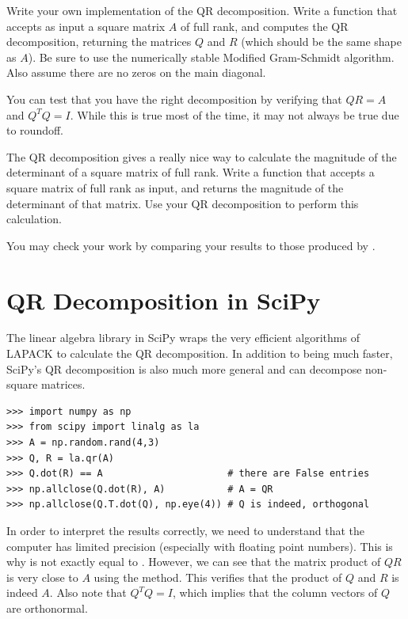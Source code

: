 \begin{problem}
\label{prob:QR}
Write your own implementation of the QR decomposition. Write a function  that accepts as input a square matrix $A$ of full rank, and computes the QR decomposition, returning the matrices $Q$ and $R$ (which should be the same shape as $A$). Be sure to use the numerically stable Modified Gram-Schmidt algorithm. Also assume there are no zeros on the main diagonal.

You can test that you have the right decomposition by verifying that $QR=A$ and $Q^T Q = I$. While this is true most of the time, it may not always be true due to roundoff.
\end{problem}

\begin{problem}
The QR decomposition gives a really nice way to calculate the magnitude of the determinant of a square matrix of full rank. Write a function  that accepts a square matrix of full rank as input, and returns the magnitude of the determinant of that matrix. Use your QR decomposition to perform this
calculation.

You may check your work by comparing your results to those produced by . 
\end{problem}

\section*{QR Decomposition in SciPy}
The linear algebra library in SciPy wraps the very efficient algorithms of LAPACK to calculate the QR decomposition.
In addition to being much faster, SciPy's QR decomposition is also much more general and can decompose non-square matrices.

\begin{lstlisting}
>>> import numpy as np
>>> from scipy import linalg as la
>>> A = np.random.rand(4,3)
>>> Q, R = la.qr(A)
>>> Q.dot(R) == A                      # there are False entries
>>> np.allclose(Q.dot(R), A)           # A = QR
>>> np.allclose(Q.T.dot(Q), np.eye(4)) # Q is indeed, orthogonal
\end{lstlisting}

In order to interpret the results correctly, we need to understand that the computer has limited precision (especially with floating point numbers).
This is why  is not exactly equal to . However, we can see that the matrix product of $QR$ is very close to $A$ using the  method. This verifies that the product of $Q$ and $R$ is indeed $A$. Also note that $Q^T Q = I$, which implies that the column vectors of $Q$ are orthonormal.


